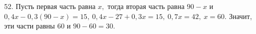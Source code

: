 52. Пусть первая часть равна $x,$ тогда вторая часть равна $90-x$ и $0,4x-0,3(90-x)=15,\ 0,4x-27+0,3x=15,\ 0,7x=42,\ x=60.$ Значит, эти части равны 60 и $90-60=30.$\\
